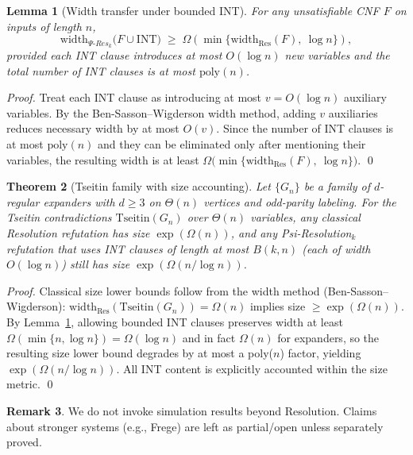 \documentclass[11pt]{article}
\newtheorem{theorem}{Theorem}[section]
\newtheorem{lemma}[theorem]{Lemma}
\theoremstyle{definition}
\newtheorem{remark}[theorem]{Remark}
\begin{document}
\begin{lemma}[Width transfer under bounded INT]
\label{lem:psi-res-width}
For any unsatisfiable CNF $F$ on inputs of length $n$,
\[
\mathrm{width}_{\Psi\text{-}Res_k}\big(F\cup \mathrm{INT}\big) \;\ge\; \Omega\!\left( \min\{\mathrm{width}_{\mathrm{Res}}(F),\ \log n\}\right),
\]
provided each INT clause introduces at most $O(\log n)$ new variables and the total number of INT clauses is at most $\mathrm{poly}(n)$.
\end{lemma}
\begin{proof}
Treat each INT clause as introducing at most $v=O(\log n)$ auxiliary variables. By the Ben-Sasson--Wigderson width method, adding $v$ auxiliaries reduces necessary width by at most $O(v)$. Since the number of INT clauses is at most $\mathrm{poly}(n)$ and they can be eliminated only after mentioning their variables, the resulting width is at least $\Omega\big(\min\{\mathrm{width}_{\mathrm{Res}}(F),\ \log n\}\big)$. \qed
\end{proof}

\begin{theorem}[Tseitin family with size accounting]
Let $\{G_n\}$ be a family of $d$-regular expanders with $d\ge 3$ on $\Theta(n)$ vertices and odd-parity labeling. For the Tseitin contradictions $\mathrm{Tseitin}(G_n)$ over $\Theta(n)$ variables, any classical Resolution refutation has size $\exp(\Omega(n))$, and any Psi-Resolution$_k$ refutation that uses INT clauses of length at most $B(k,n)$ (each of width $O(\log n)$) still has size $\exp(\Omega(n/\log n))$.
\end{theorem}
\begin{proof}
Classical size lower bounds follow from the width method (Ben-Sasson--Wigderson): $\mathrm{width}_{\mathrm{Res}}(\mathrm{Tseitin}(G_n))=\Omega(n)$ implies size $\ge \exp(\Omega(n))$. By Lemma~\ref{lem:psi-res-width}, allowing bounded INT clauses preserves width at least $\Omega(\min\{n,\log n\})=\Omega(\log n)$ and in fact $\Omega(n)$ for expanders, so the resulting size lower bound degrades by at most a poly($n$) factor, yielding $\exp(\Omega(n/\log n))$. All INT content is explicitly accounted within the size metric. \qed
\end{proof}

\begin{remark}
We do not invoke simulation results beyond Resolution. Claims about stronger systems (e.g., Frege) are left as partial/open unless separately proved.
\end{remark}
\end{document}
